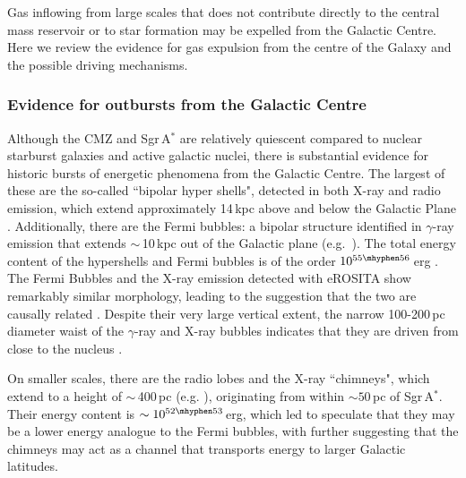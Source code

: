 Gas inflowing from large scales that does not contribute directly to the central mass reservoir or to star formation may be expelled from the Galactic Centre. Here we review the evidence for gas expulsion from the centre of the Galaxy and the possible driving mechanisms. 

\subsubsection{Evidence for outbursts from the Galactic Centre}
\label{sec:feedback:largescaleoutflow}

Although the CMZ and Sgr\,A$^{*}$ are relatively quiescent compared to nuclear starburst galaxies and active galactic nuclei, there is substantial evidence for historic bursts of energetic phenomena from the Galactic Centre. The largest of these are the so-called ``bipolar hyper shells", detected in both X-ray and radio emission, which extend approximately 14\,kpc above and below the Galactic Plane \citep{Sofue2000, Carretti2013, Sofue2016, Predehl2020}.
Additionally, there are the Fermi bubbles: a bipolar structure identified in $\gamma$-ray emission that extends $\sim$\,10\,kpc out of the Galactic plane (e.g.\ \citealp{Su2010, Ackermann2014}). 
The total energy content of the hypershells and Fermi bubbles is of the order $10^{55\mhyphen56}$\,erg \citep{Sofue1987, Bland-Hawthorn2003, Su2010}. 
The Fermi Bubbles and the X-ray emission detected with eROSITA show remarkably similar morphology, leading to the suggestion that the two are causally related \citep{Predehl2020}. 
Despite their very large vertical extent, the narrow 100-200\,pc diameter waist of the $\gamma$-ray and X-ray bubbles indicates that they are driven from close to the nucleus \citep{Carretti2013}. 

On smaller scales, there are the radio lobes and the X-ray ``chimneys", which extend to a height of $\sim$\,400\,pc (e.g. \citealp{Sofue1984, Law2009, Law2010, Ponti2019, Heywood2019}), originating from within $\sim50$\,pc of Sgr\,A$^{*}$. 
Their energy content is $\sim10^{52\mhyphen53}$\,erg, which led \citet{Heywood2019} to speculate that they may be a lower energy analogue to the Fermi bubbles, with \citet[][see also \citealp{Ponti2021}]{Ponti2019} further suggesting that the chimneys may act as a channel that transports energy to larger Galactic latitudes. 

